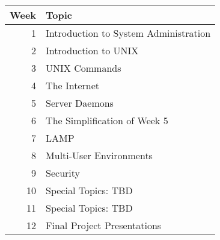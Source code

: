 \documentclass[letterpaper]{article}
\begin{document}
\begin{tabular*}{\textwidth}[l]{r|l}
Week & Topic \\
\hline\hline
1 & Introduction to System Administration \\[0.5em]
2 & Introduction to UNIX \\[0.5em]
3 & UNIX Commands \\[0.5em]
4 & The Internet \\[0.5em]
5 & Server Daemons \\[0.5em]
6 & The Simplification of Week 5 \\[0.5em]
7 & LAMP \\[0.5em]
8 & Multi-User Environments \\[0.5em]
9 & Security \\[0.5em]
10 & Special Topics: TBD \\[0.5em]
11 & Special Topics: TBD \\[0.5em]
12 & Final Project Presentations\\[0.5em]
\end{tabular*}
\end{document}
